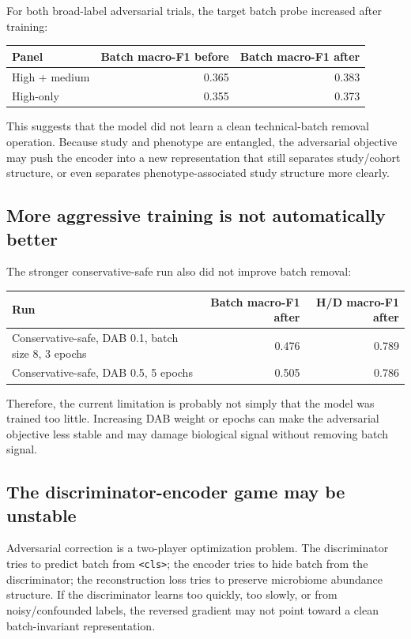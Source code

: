 \documentclass[11pt]{article}
\newcommand{\code}[1]{\texttt{\small #1}}
\begin{document}
For both broad-label adversarial trials, the target batch probe increased after training:

\begin{center}
\begin{tabular}{lrr}
\toprule
Panel & Batch macro-F1 before & Batch macro-F1 after \\
\midrule
High + medium & 0.365 & 0.383 \\
High-only & 0.355 & 0.373 \\
\bottomrule
\end{tabular}
\end{center}

This suggests that the model did not learn a clean technical-batch removal operation.
Because study and phenotype are entangled, the adversarial objective may push the encoder
into a new representation that still separates study/cohort structure, or even separates
phenotype-associated study structure more clearly.

\subsection{More aggressive training is not automatically better}

The stronger conservative-safe run also did not improve batch removal:

\begin{center}
\begin{tabular}{lrr}
\toprule
Run & Batch macro-F1 after & H/D macro-F1 after \\
\midrule
Conservative-safe, DAB 0.1, batch size 8, 3 epochs & 0.476 & 0.789 \\
Conservative-safe, DAB 0.5, 5 epochs & 0.505 & 0.786 \\
\bottomrule
\end{tabular}
\end{center}

Therefore, the current limitation is probably not simply that the model was trained too
little. Increasing DAB weight or epochs can make the adversarial objective less stable and
may damage biological signal without removing batch signal.

\subsection{The discriminator-encoder game may be unstable}

Adversarial correction is a two-player optimization problem. The discriminator tries to
predict batch from \code{<cls>}; the encoder tries to hide batch from the discriminator;
the reconstruction loss tries to preserve microbiome abundance structure. If the
discriminator learns too quickly, too slowly, or from noisy/confounded labels, the reversed
gradient may not point toward a clean batch-invariant representation.
\end{document}
